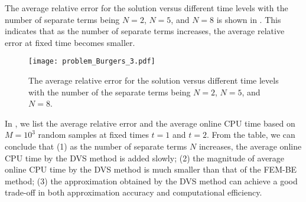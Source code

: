 \documentclass[10pt,a4paper]{article}
\numberwithin{equation}{section}
\numberwithin{lemma}{section}
\numberwithin{example}{section}
\numberwithin{definition}{section}
\numberwithin{assumption}{section}
\numberwithin{theorem}{section}
\numberwithin{proposition}{section}
\numberwithin{corollary}{section}
\numberwithin{remark}{section}
\begin{document}
 
	The average relative error for the solution versus different time levels with the number of separate terms being $N=2$, $N=5$, and $N=8$ is shown in . This indicates that as the number of separate terms increases, the average relative error at fixed time becomes smaller.
	\begin{figure}[htbp]
		\centering
		\texttt{[image: problem\_Burgers\_3.pdf]}
		\caption{The average relative error for the solution versus different time levels with the number of the separate terms being $N=2$, $N=5$, and $N=8$.}
		\label{fig_burgers.3}
	\end{figure}
	
	In , we list the average relative error and the average online CPU time based on $M=10^3$ random samples at fixed times $t=1$ and $t=2$.
	From the table, we can conclude that (1) as the number of separate terms $N$ increases, the average online CPU time by the DVS method is added slowly; (2) the magnitude of average online CPU time by the DVS method is much smaller than that of the FEM-BE method;
(3) the approximation obtained by the DVS method can achieve a good trade-off in both approximation accuracy and computational efficiency.
\end{document}
